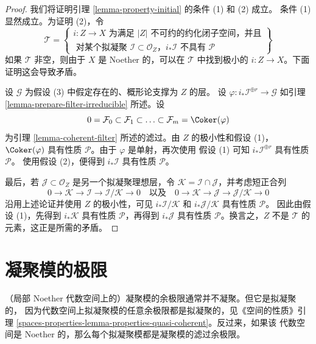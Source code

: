 \begin{proof}
我们将证明引理 \ref{lemma-property-initial} 的条件 (1) 和 (2) 成立。
条件 (1) 显然成立。为证明 (2)，令
$$
\mathcal{T} =
\left\{
\begin{matrix}
i : Z \to X \text{ 为满足 }|Z|\text{ 不可约的约化闭子空间，并且}\\
\text{ 对某个拟凝聚 }\mathcal{I} \subset \mathcal{O}_Z\text{，}
i_*\mathcal{I}\text{ 不具有 }\mathcal{P}
\end{matrix}
\right\}
$$
如果 $\mathcal{T}$ 非空，则由于 $X$ 是 Noether 的，可以在
$\mathcal{T}$ 中找到极小的 $i : Z \to X$。下面证明这会导致矛盾。

\medskip\noindent
设 $\mathcal{G}$ 为假设 (3) 中假定存在的、概形论支撑为 $Z$ 的层。%
设 $\varphi : i_*\mathcal{I}^{\oplus r} \to \mathcal{G}$ 如引理
\ref{lemma-prepare-filter-irreducible} 所述。设
$$
0 = \mathcal{F}_0 \subset \mathcal{F}_1 \subset
\ldots \subset \mathcal{F}_m = \Coker(\varphi)
$$
为引理 \ref{lemma-coherent-filter} 所述的滤过。由 $Z$ 的极小性和假设 (1)，
$\Coker(\varphi)$ 具有性质 $\mathcal{P}$。由于 $\varphi$ 是单射，再次使用
假设 (1) 可知 $i_*\mathcal{I}^{\oplus r}$ 具有性质 $\mathcal{P}$。
使用假设 (2)，便得到 $i_*\mathcal{I}$ 具有性质 $\mathcal{P}$。

\medskip\noindent
最后，若 $\mathcal{J} \subset \mathcal{O}_Z$ 是另一个拟凝聚理想层，令
$\mathcal{K} = \mathcal{I} \cap \mathcal{J}$，并考虑短正合列
$$
0 \to \mathcal{K} \to \mathcal{I} \to \mathcal{I}/\mathcal{K} \to 0
\quad
\text{以及}
\quad
0 \to \mathcal{K} \to \mathcal{J} \to \mathcal{J}/\mathcal{K} \to 0
$$
沿用上述论证并使用 $Z$ 的极小性，可见
$i_*\mathcal{I}/\mathcal{K}$ 和 $i_*\mathcal{J}/\mathcal{K}$
具有性质 $\mathcal{P}$。%
因此由假设 (1)，先得到 $i_*\mathcal{K}$ 具有性质 $\mathcal{P}$，再得到
$i_*\mathcal{J}$ 具有性质 $\mathcal{P}$。换言之，$Z$ 不是
$\mathcal{T}$ 的元素，这正是所需的矛盾。
\end{proof}






\section{凝聚模的极限}
\label{section-limits}

\noindent
（局部 Noether 代数空间上的）凝聚模的余极限通常并不凝聚。但它是拟凝聚的，
因为代数空间上拟凝聚模的任意余极限都是拟凝聚的，见《空间的性质》引理
\ref{spaces-properties-lemma-properties-quasi-coherent}。反过来，如果该
代数空间是 Noether 的，那么每个拟凝聚模都是凝聚模的滤过余极限。


